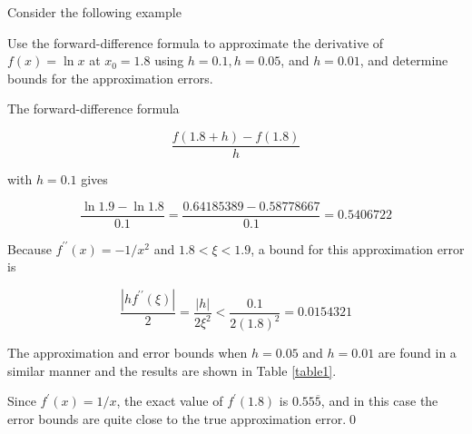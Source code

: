 





Consider the following example

\begin{example} \label{numediffexample1}
Use the forward-difference formula to approximate the derivative of $f(x)=\ln x$ at $x_{0}=1.8$ using $h=0.1, h=0.05$, and $h=0.01$, and determine bounds for the approximation errors.
\end{example}
\begin{mysolution} 
The forward-difference formula

$$
\frac{f(1.8+h)-f(1.8)}{h}
$$

with $h=0.1$ gives

$$
\frac{\ln 1.9-\ln 1.8}{0.1}=\frac{0.64185389-0.58778667}{0.1}=0.5406722
$$

Because $f^{\prime \prime}(x)=-1 / x^{2}$ and $1.8<\xi<1.9$, a bound for this approximation error is

$$
\frac{\left|h f^{\prime \prime}(\xi)\right|}{2}=\frac{|h|}{2 \xi^{2}}<\frac{0.1}{2(1.8)^{2}}=0.0154321
$$

The approximation and error bounds when $h=0.05$ and $h=0.01$ are found in a similar manner and the results are shown in Table \ref{table1}.




Since $f^{\prime}(x)=1 / x$, the exact value of $f^{\prime}(1.8)$ is $0.55 \overline{5}$, and in this case the error bounds are quite close to the true approximation error.\qed
\end{mysolution}

